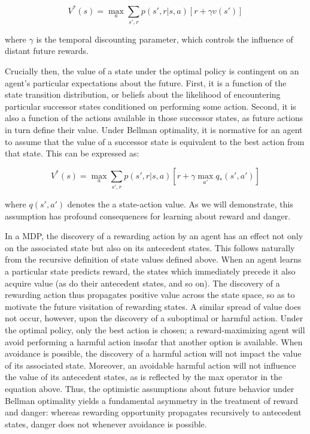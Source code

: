 \documentclass[11pt]{article} %
\begin{document}
$$ V^*(s) = \max_a \sum_{s',r} p(s',r|s,a) \left[ r + \gamma v(s') \right] $$

where $\gamma$ is the temporal discounting parameter, which controls the influence of distant future rewards.

Crucially then, the value of a state under the optimal policy is contingent on an agent's particular expectations about the future. First, it is a function of the state transition distribution, or beliefs about the likelihood of encountering particular successor states conditioned on performing some action. Second, it is also a function of the actions available in those successor states, as future actions in turn define their value. Under Bellman optimality, it is normative for an agent to assume that the value of a successor state is equivalent to the best action from that state. This can be expressed as:

$$ V^*(s) = \max_a \sum_{s',r}p(s',r|s,a) \left[ r + \gamma \max_{a'} q_*(s',a') \right] $$

where $q(s',a')$ denotes the a state-action value. As we will demonstrate, this assumption has profound consequences for learning about reward and danger.

In a MDP, the discovery of a rewarding action by an agent has an effect not only on the associated state but also on its antecedent states. This follows naturally from the recursive definition of state values defined above. When an agent learns a particular state predicts reward, the states which immediately precede it also acquire value (as do their antecedent states, and so on). The discovery of a rewarding action thus propagates positive value across the state space, so as to motivate the future visitation of rewarding states. A similar spread of value does not occur, however, upon the discovery of a suboptimal or harmful action. Under the optimal policy, only the best action is chosen; a reward-maximizing agent will avoid performing a harmful action insofar that another option is available. When avoidance is possible, the discovery of a harmful action will not impact the value of its associated state. Moreover, an avoidable harmful action will not influence the value of its antecedent states, as is reflected by the max operator in the equation above. Thus, the optimistic assumptions about future behavior under Bellman optimality yields a fundamental asymmetry in the treatment of reward and danger: whereas rewarding opportunity propagates recursively to antecedent states, danger does not whenever avoidance is possible.
\end{document}
